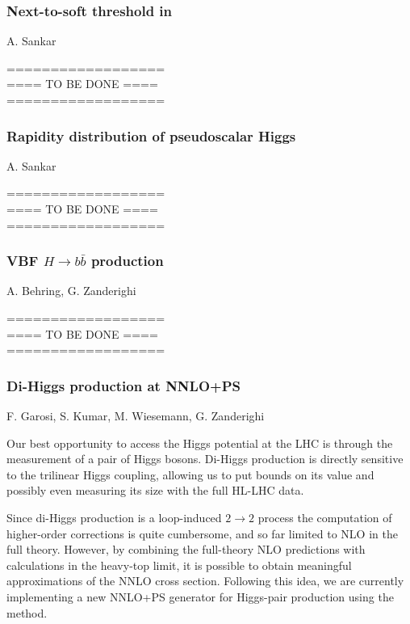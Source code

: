 \documentclass{FBR_Bericht_2025}
\begin{document}
\begin{refsection}
\subsubsection{Next-to-soft threshold in \bbH{}}
\begin{Namen}
A. Sankar
\end{Namen}
%
{\color{red} ==================\\ ====\; TO BE DONE\; ====\\ ==================}
%
\subsubsection{Rapidity distribution of pseudoscalar Higgs}
\begin{Namen}
A. Sankar
\end{Namen}
%
{\color{red} ==================\\ ====\; TO BE DONE\; ====\\ ==================}
%
\subsubsection{VBF $H\rightarrow b\bar{b}$ production}
\begin{Namen}
A. Behring, G. Zanderighi
\end{Namen}
%
{\color{red} ==================\\ ====\; TO BE DONE\; ====\\ ==================}
%
\subsubsection{Di-Higgs production at NNLO+PS}
\begin{Namen}
F. Garosi, S. Kumar, M. Wiesemann, G. Zanderighi
\end{Namen}

Our best opportunity to access the Higgs potential at the LHC is through the measurement
of a pair of Higgs bosons. Di-Higgs production is directly sensitive to the trilinear Higgs coupling,
allowing us to put bounds on its value and possibly even measuring its size with the full HL-LHC data.

Since di-Higgs production is a loop-induced $2\to 2$ process the computation of higher-order 
corrections is quite cumbersome, and so far limited to NLO in the full theory. However, by combining
the full-theory NLO predictions with calculations in the heavy-top limit, it is possible to obtain 
meaningful approximations of the NNLO cross section. Following this idea, we are currently 
implementing a new NNLO+PS generator for Higgs-pair production using the \minnlo{} method.


\printbibliography[heading=subbibliography]
\end{refsection}
\end{document}
